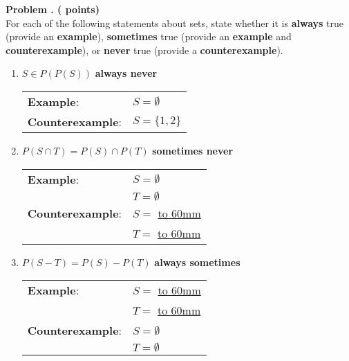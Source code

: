 
\newpage
\addtocounter{problemctr}{1}

{\bf
Problem \theproblemctr.  (\thepowersets\xspace points)}
\\

For each of the following statements about sets, 
state whether it is {\bf always} true (provide an {\bf example}),
{\bf sometimes} true (provide an {\bf example} and {\bf counterexample}), or {\bf never} true (provide a {\bf counterexample}).

\bigskip

\begin{enumerate}[label=(\arabic*),itemsep=.2in]

\item $S\in P(P(S))$
\textbf{\hfill always \quad\quad\quad {} \quad\quad\quad never}
\renewcommand{\arraystretch}{3}
\begin{tabular}{ll}
\textbf{Example}: & $S= \emptyset$\\
\textbf{Counterexample}: & $S= \{1,2\}$\\
\end{tabular}


\item $P(S\cap T) = P(S)\cap P(T)$
\textbf{\hfill {} \quad\quad\quad sometimes \quad\quad\quad never}
\renewcommand{\arraystretch}{3}
\begin{tabular}{ll}
\textbf{Example}: & $S= \emptyset$\\
& $T= \emptyset$\\
\textbf{Counterexample}: & $S=$ \underline{\hbox to 60mm{}}\\
& $T=$ \underline{\hbox to 60mm{}}\\
\end{tabular}
\newpage

\item $P(S - T) = P(S) - P(T)$
\textbf{\hfill always \quad\quad\quad sometimes \quad\quad\quad {}}
\renewcommand{\arraystretch}{3}
\begin{tabular}{ll}
\textbf{Example}: & $S=$ \underline{\hbox to 60mm{}}\\
& $T=$ \underline{\hbox to 60mm{}}\\
\textbf{Counterexample}: & $S= \emptyset$\\
& $T= \emptyset$\\
\end{tabular}

\end{enumerate}


